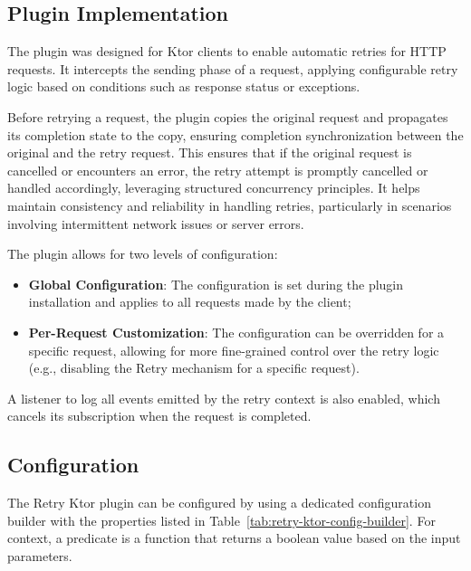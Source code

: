 \subsection{Plugin Implementation}\label{subsec:request-retry-plugin}

The plugin was designed for Ktor clients to enable automatic retries for HTTP requests.
It intercepts the sending phase of a request,
applying configurable retry logic based on conditions such as response status or exceptions.

Before retrying a request,
the plugin copies the original request and propagates its completion state to the copy,
ensuring completion synchronization between the original and the retry request.
This ensures that if the original request is cancelled or encounters an error,
the retry attempt is promptly cancelled or handled accordingly, leveraging structured concurrency principles.
It helps maintain consistency and reliability in handling retries, particularly in scenarios involving intermittent network issues or server errors.

The plugin allows for two levels of configuration:

\begin{itemize}
    \item \textbf{Global Configuration}: The configuration is set during the plugin installation and applies to all requests made by the client;
    \item \textbf{Per-Request Customization}: The configuration can be overridden for a specific request, allowing for more fine-grained control over the retry logic (e.g., disabling the Retry mechanism for a specific request).
\end{itemize}

A listener to log all events emitted by the retry context is also enabled,
which cancels its subscription when the request is completed.

\subsection{Configuration}\label{subsec:retry-ktor-configuration}

The Retry Ktor plugin can be configured by using a dedicated configuration builder with the properties listed in
Table~\ref{tab:retry-ktor-config-builder}.
For context, a predicate is a function that returns a boolean value based on the input parameters.


